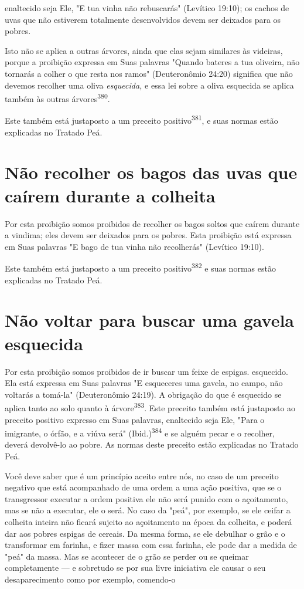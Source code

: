 \begin{itemize}
\begin{enumrate}
\begin{itemize}
\begin{itemize}
\begin{itemize}
enaltecido seja Ele, "E tua vinha não rebuscarás" (Levítico 19:10); os
cachos de uvas que não estiverem totalmente desenvolvidos devem ser
deixados para os pobres.

Isto não se aplica a outras árvores, ainda que elas sejam similares às
videiras, porque a proibição expressa em Suas palavras "Quando bateres a
tua oliveira, não tornarás a colher o que resta nos ramos" (Deuteronômio
24:20) significa que não devemos recolher uma oliva \emph{esquecida,} e
essa lei sobre a oli­va esquecida se aplica também às outras
árvores\textsuperscript{380}.

Este também está justaposto a um preceito positivo\textsuperscript{381},
e suas nor­mas estão explicadas no Tratado Peá.

\section{Não recolher os bagos das uvas que caírem durante a colheita}

Por esta proibição somos proibidos de recolher os bagos soltos que
caírem durante a vindima; eles devem ser deixados para os pobres. Esta
proibi­ção está expressa em Suas palavras "E bago de tua vinha não
recolherás" (Leví­tico 19:10).

Este também está justaposto a um preceito positivo\textsuperscript{382}
e suas nor­mas estão explicadas no Tratado Peá.

\section{Não voltar para buscar uma gavela esquecida}

Por esta proibição somos proibidos de ir buscar um feixe de espigas.
esquecido. Ela está expressa em Suas palavras "E esqueceres uma gavela,
no campo, não voltarás a tomá-la" (Deuteronômio 24:19). A obrigação do
que é esquecido se aplica tanto ao solo quanto à
árvore\textsuperscript{383}. Este preceito também está justaposto ao
preceito positivo expresso em Suas palavras, enaltecido seja Ele, "Para
o imigrante, o órfão, e a viúva será" (Ibid.)\textsuperscript{384} e se
alguém pecar e o re­colher, deverá devolvê-lo ao pobre. As normas deste
preceito estão explicadas no Tratado Peá.

Você deve saber que é um princípio aceito entre nós, no caso de um
preceito negativo que está acompanhado de uma ordem a uma ação positiva,
que se o transgressor executar a ordem positiva ele não será punido com
o açoitamento, mas se não a executar, ele o será. No caso da "peá", por
exemplo, se ele ceifar a colheita inteira não ficará sujeito ao
açoitamento na época da colheita, e poderá dar aos pobres espigas de
cereais. Da mesma for­ma, se ele debulhar o grão e o transformar em
farinha, e fizer massa com essa farinha, ele pode dar a medida de "peá"
da massa. Mas se acontecer de o grão se perder ou se queimar
completamente --- e sobretudo se por sua livre iniciativa ele causar o
seu desaparecimento como por exemplo, comendo-o



\end{itemize}
\end{itemize}
\end{itemize}
\end{enumrate}
\end{itemize}
